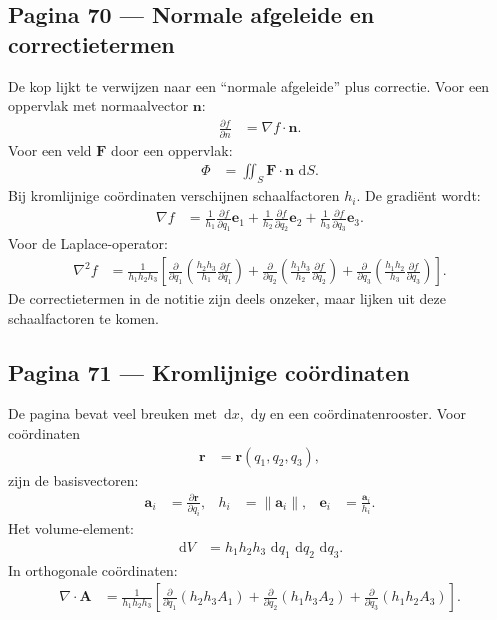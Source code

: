 \documentclass[11pt]{article}
\newcommand{\dd}{\,\mathrm{d}}
\newcommand{\pd}[2]{\frac{\partial #1}{\partial #2}}
\newcommand{\vect}[1]{\mathbf{#1}}
\newcommand{\onzeker}[1]{\textcolor{red!70!black}{#1}}
\begin{document}
\subsection*{Pagina 70 --- Normale afgeleide en correctietermen}

De kop lijkt te verwijzen naar een ``normale afgeleide'' plus correctie. Voor een oppervlak met normaalvector $\vect{n}$:
\begin{align*}
\pd{f}{n}
&=
\nabla f\cdot \vect{n}.
\end{align*}
Voor een veld $\vect{F}$ door een oppervlak:
\begin{align*}
\Phi
&=
\iint_S \vect{F}\cdot\vect{n}\,\dd S.
\end{align*}
Bij kromlijnige coördinaten verschijnen schaalfactoren $h_i$. De gradiënt wordt:
\begin{align*}
\nabla f
&=
\frac{1}{h_1}\pd{f}{q_1}\vect{e}_1
+
\frac{1}{h_2}\pd{f}{q_2}\vect{e}_2
+
\frac{1}{h_3}\pd{f}{q_3}\vect{e}_3.
\end{align*}
Voor de Laplace-operator:
\begin{align*}
\nabla^2 f
&=
\frac{1}{h_1h_2h_3}
\left[
\pd{}{q_1}\left(\frac{h_2h_3}{h_1}\pd{f}{q_1}\right)
+
\pd{}{q_2}\left(\frac{h_1h_3}{h_2}\pd{f}{q_2}\right)
+
\pd{}{q_3}\left(\frac{h_1h_2}{h_3}\pd{f}{q_3}\right)
\right].
\end{align*}
De correctietermen in de notitie zijn deels \onzeker{onzeker}, maar lijken uit deze schaalfactoren te komen.

\subsection*{Pagina 71 --- Kromlijnige coördinaten}

De pagina bevat veel breuken met $\dd x$, $\dd y$ en een coördinatenrooster. Voor coördinaten
\begin{align*}
\vect{r}
&=
\vect{r}(q_1,q_2,q_3),
\end{align*}
zijn de basisvectoren:
\begin{align*}
\vect{a}_i
&=
\pd{\vect{r}}{q_i},
&
h_i&=\|\vect{a}_i\|,
&
\vect{e}_i&=\frac{\vect{a}_i}{h_i}.
\end{align*}
Het volume-element:
\begin{align*}
\dd V
&=
h_1h_2h_3\,\dd q_1\,\dd q_2\,\dd q_3.
\end{align*}
In orthogonale coördinaten:
\begin{align*}
\nabla\cdot \vect{A}
&=
\frac{1}{h_1h_2h_3}
\left[
\pd{}{q_1}(h_2h_3 A_1)
+
\pd{}{q_2}(h_1h_3 A_2)
+
\pd{}{q_3}(h_1h_2 A_3)
\right].
\end{align*}
\end{document}
